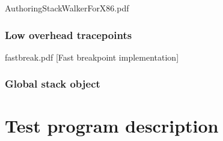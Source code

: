 AuthoringStackWalkerForX86.pdf

\subsubsection{Low overhead tracepoints}
\label{subsubsection:lowoverheadtracepoints}

fastbreak.pdf [Fast breakpoint implementation]

\subsubsection{Global stack object}
\label{subsubsection:globalstackobject}

\section{Test program description}
\label{section:testprogram}
